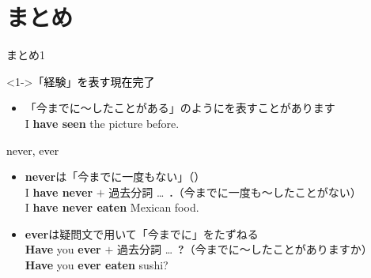 \documentclass[aspectratio=169,xcolor={dvipsnames,table}]{beamer}
\begin{document}
\section{まとめ}
\begin{frame}[plain,t]{まとめ1}
 
\begin{block}<1->{\textcolor{black}{\mdseries 「経験」を表す現在完了}}
\small

\begin{itemize}[square]
 \item 「今までに～したことがある」のようにを表すことがあります\\
\hfill{\scriptsize I {\bfseries have seen} the picture before.}
\end{itemize}
\end{block}

\begin{block}{\textcolor{black}{\mdseries never, ever}}
\small
\begin{itemize}[square]\small
 \item {\bfseries never}は「今までに一度もない」（）\\
I {\bfseries have never} $+$ 過去分詞 \ldots\,\,\,\textbf{.}{{\footnotesize （今までに一度も〜したことがない）}}\\

\hfill{\scriptsize I {\bfseries have never eaten} Mexican food.}
 \item {\bfseries ever}は疑問文で用いて「今までに」\hfill{をたずねる}\\
{\bfseries Have} you  {\bfseries ever} $+$ 過去分詞 \ldots\,\,\,\textbf{?}{{\footnotesize （今までに〜したことがありますか）}}\\
\hfill{\scriptsize {\bfseries Have} you {\bfseries ever eaten} sushi?}
\end{itemize}
\end{block}
\end{frame}
\end{document}
